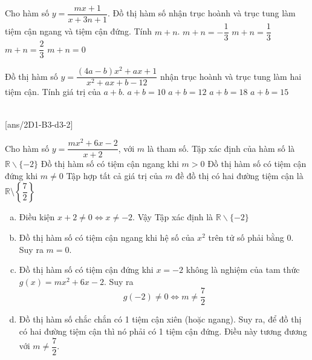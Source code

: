 \begin{ex}%
	Cho hàm số $y=\dfrac{mx+1}{x+3n+1}$. Đồ thị hàm số nhận trục hoành và trục tung làm tiệm cận ngang và tiệm cận đứng. Tính $m+n$.
	\choice
	{\True $m+n=-\dfrac{1}{3}$}
	{$m+n=\dfrac{1}{3}$}
	{$m+n=\dfrac{2}{3}$}
	{$m+n=0$}
\end{ex}
\begin{ex}%
	Đồ thị hàm số $y=\dfrac{(4a-b)x^2+ax+1}{x^2+ax+b-12}$ nhận trục hoành và trục tung làm hai tiệm cận. Tính giá trị của $a+b$.
	\choice
	{$a+b=10$}
	{$a+b=12$}
	{$a+b=18$}
	{\True $a+b=15$}
\end{ex}

 \\
[ans/2D1-B3-d3-2]
\begin{ex}%
	Cho hàm số $y=\dfrac{mx^2+6x-2}{x+2}$, với $m$ là tham số.
	\choiceTF
	{\True Tập xác định của hàm số là $\mathbb{R}\backslash\{-2\}$}
	{Đồ thị hàm số có tiệm cận ngang khi $m>0$}
	{Đồ thị hàm số có tiệm cận đứng khi $m\ne 0$}
	{\True Tập hợp tất cả giá trị của $m$ đề đồ thị có hai đường tiệm cận là $\mathbb{R}\setminus\left\{\dfrac{7}{2}\right\}$}
	\loigiai
	{
		\begin{enumerate}[a)]
			\item Điều kiện $x+2 \ne 0 \Leftrightarrow x \ne -2$. Vậy Tập xác định là $\mathbb{R}\backslash\{-2\}$
			\item Đồ thị hàm số có tiệm cận ngang khi hệ số của $x^2$ trên tử số phải bằng 0. Suy ra $m=0$.
			\item Đồ thị hàm số có tiệm cận đứng khi $x=-2$ không là nghiệm của tam thức $g(x)=mx^2+6x-2$. Suy ra
			$$g(-2)\ne 0 \Leftrightarrow m \ne \dfrac{7}{2}$$
			\item Đồ thị hàm số chắc chắn có 1 tiệm cận xiên (hoặc ngang). Suy ra, để đồ thị có hai đường tiệm cận thì nó phải có 1 tiệm cận đứng. Điều này tương đương với $m \ne \dfrac{7}{2}$.
		\end{enumerate}
	}
\end{ex}
